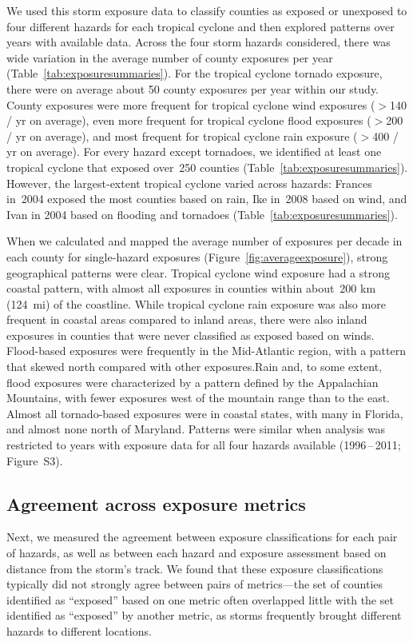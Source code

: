 We used this storm exposure data to classify counties as exposed or unexposed
to four different hazards for each tropical cyclone and then explored patterns
over years with available data. Across the four storm hazards considered, there
was wide variation in the average number of county exposures per year
(Table~\ref{tab:exposuresummaries}). For the tropical cyclone tornado exposure,
there were on average about 50 county exposures per year within our study.
County exposures were more frequent for tropical cyclone wind exposures ($>$140
/ yr on average), even more frequent for tropical cyclone flood exposures
($>$200 / yr on average), and most frequent for tropical cyclone rain exposure
($>$400 / yr on average). For every hazard except tornadoes, we identified at
least one tropical cyclone that exposed over~250 counties
(Table~\ref{tab:exposuresummaries}).  However, the largest-extent tropical
cyclone varied across hazards: Frances in~2004 exposed the most counties based
on rain, Ike in~2008 based on wind, and Ivan in 2004 based on flooding and
tornadoes (Table~\ref{tab:exposuresummaries}).

When we calculated and mapped the average number of exposures per decade in
each county for single-hazard exposures (Figure~\ref{fig:averageexposure}),
strong geographical patterns were clear. Tropical cyclone wind exposure had a
strong coastal pattern, with almost all exposures in counties within about~200
\si{\kilo\metre} (124~mi) of the coastline. While tropical cyclone rain
exposure was also more frequent in coastal areas compared to inland areas,
there were also inland exposures in counties that were never classified as
exposed based on winds. Flood-based exposures were frequently in the
Mid-Atlantic region, with a pattern that skewed north compared with other
exposures.Rain and, to some extent, flood exposures were characterized by a
pattern defined by the Appalachian Mountains, with fewer exposures west of the
mountain range than to the east. Almost all tornado-based exposures were in
coastal states, with many in Florida, and almost none north of Maryland.
Patterns were similar when analysis was restricted to years with exposure data
for all four hazards available (1996\,--\,2011; Figure~S3). 

\subsection*{Agreement across exposure metrics}

Next, we measured the agreement between exposure classifications for each pair
of hazards, as well as between each hazard and exposure assessment based on
distance from the storm's track. We found that these exposure classifications
typically did not strongly agree between pairs of metrics---the set of counties
identified as ``exposed'' based on one metric often overlapped little with the set
identified as ``exposed'' by another metric, as storms frequently brought
different hazards to different locations. 

